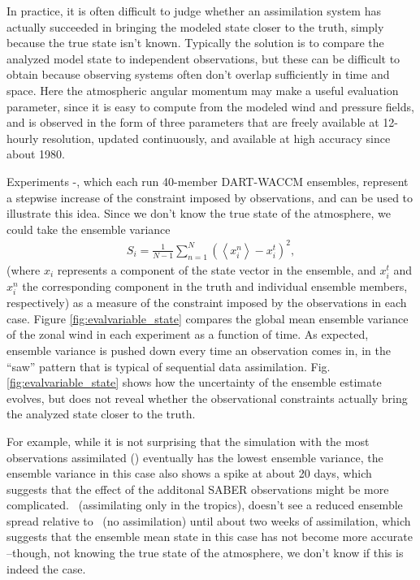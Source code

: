 In practice, it is often difficult to judge whether an assimilation system has actually succeeded in bringing the modeled state closer to the truth, simply because the true state isn't known. 
Typically the solution is to compare the analyzed model state to independent observations, but these can be difficult to obtain because observing systems often don't overlap sufficiently in time and space.
Here the atmospheric angular momentum may make a useful evaluation parameter, since it is easy to compute from the modeled wind and pressure fields, and is observed in the form of three parameters that are freely available at 12-hourly resolution, updated continuously, and available at high accuracy since about 1980.  

Experiments \WACCMNODA-\NCARFULL, which each run 40-member DART-WACCM ensembles, 
represent a stepwise increase of the constraint imposed by observations, and can be used to illustrate this idea.
Since we don't know the true state of the atmosphere, we could take the ensemble variance 
\begin{eqnarray}
S_i = 
\frac{1}{N-1}
\sum_{n=1}^N
\left(
	\left< x_{i}^{n} \right>-x_i^t
\right)^2,
\label{eq:spread}
\end{eqnarray}
(where $x_{i}$ represents a component of the state vector in the ensemble,  and $x_{i}^t$ and $x_{i}^n$ the corresponding component in the truth and individual ensemble members, respectively) as a measure of the constraint imposed by the observations in each case. 
Figure \ref{fig:evalvariable_state} compares 
the global mean ensemble variance of the zonal wind in each experiment as a function of time.  
As expected, ensemble variance is pushed down every time an observation comes in, in the ``saw'' pattern that is typical of sequential data assimilation. 
Fig.  \ref{fig:evalvariable_state} shows how the uncertainty of the ensemble estimate evolves, but does not reveal whether the observational constraints actually bring the analyzed state closer to the truth. 

For example, while it is not surprising that the simulation with the most observations assimilated (\NCARFULL) eventually has the lowest ensemble variance, the ensemble variance in this case also shows a spike at about 20 days, which suggests that the effect of the additonal SABER observations might be more complicated. 
\WACCMTROPICS~(assimilating only in the tropics), doesn't see a reduced ensemble spread relative to \NODA~(no assimilation) until about two weeks of assimilation, which suggests that the ensemble mean state in this case has not become more accurate --though, not knowing the true state of the atmosphere, we don't know if this is indeed the case.  


